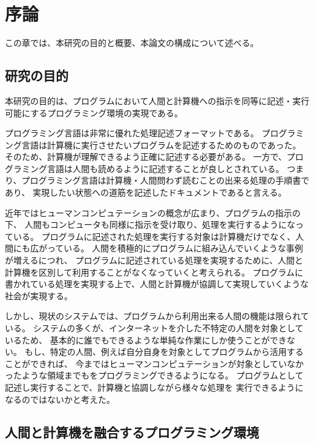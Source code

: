 \chapter{序論}\label{chap:introduction}

この章では、本研究の目的と概要、本論文の構成について述べる。

\section{研究の目的}\label{ux7814ux7a76ux306eux76eeux7684}

本研究の目的は、プログラムにおいて人間と計算機への指示を同等に記述・実行可能にするプログラミング環境の実現である。

プログラミング言語は非常に優れた処理記述フォーマットである。
プログラミング言語は計算機に実行させたいプログラムを記述するためのものであった。
そのため、計算機が理解できるよう正確に記述する必要がある。
一方で、プログラミング言語は人間も読めるように記述することが良しとされている。
つまり、プログラミング言語は計算機・人間問わず読むことの出来る処理の手順書であり、
実現したい状態への道筋を記述したドキュメントであると言える。

近年ではヒューマンコンピュテーションの概念が広まり、プログラムの指示の下、
人間もコンピュータも同様に指示を受け取り、処理を実行するようになっている。
プログラムに記述された処理を実行する対象は計算機だけでなく、人間にも広がっている。
人間を積極的にプログラムに組み込んでいくような事例が増えるにつれ、
プログラムに記述されている処理を実現するために、人間と計算機を区別して利用することがなくなっていくと考えられる。
プログラムに書かれている処理を実現する上で、人間と計算機が協調して実現していくような
社会が実現する。

しかし、現状のシステムでは、プログラムから利用出来る人間の機能は限られている。
システムの多くが、インターネットを介した不特定の人間を対象としているため、
基本的に誰でもできるような単純な作業にしか使うことができない。
もし、特定の人間、例えば自分自身を対象としてプログラムから活用することができれば、
今まではヒューマンコンピュテーションが対象としていなかったような領域までもをプログラミングできるようになる。
プログラムとして記述し実行することで、計算機と協調しながら様々な処理を
実行できるようになるのではないかと考えた。

\section{人間と計算機を融合するプログラミング環境}\label{ux4ebaux9593ux3068ux8a08ux7b97ux6a5fux3092ux878dux5408ux3059ux308bux30d7ux30edux30b0ux30e9ux30dfux30f3ux30b0ux74b0ux5883}

